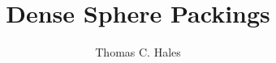 \documentclass[spanningrule]{cambridge7A}
\def\lll{\resetlinenumber[1]}
\def\tocpart#1{
  \addcontentsline{toc}{part}{\Large{#1}}}
\def\linput#1{\lll}
\theoremstyle{plain}
\theoremstyle{definition}
\theoremstyle{remark}
\begin{document}
\title[a blueprint for formal proofs]
    {%
      Dense Sphere Packings}
\author{Thomas C. Hales}
    
    \frontmatter
    \maketitle
    \tableofcontents


   
   \newpage
 
  \mainmatter
  \begin{runninglinenumbers*}
  
    
    

    
    \linput{local}
    
    \end{runninglinenumbers*}
    \appendix


%
%

\end{document}
